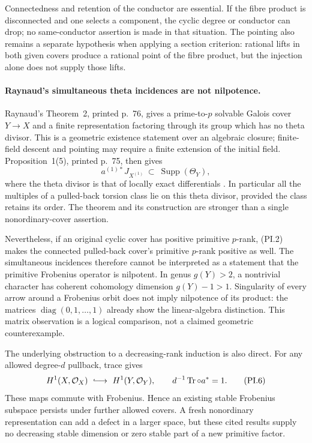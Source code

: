 \documentclass[11pt,a4paper]{article}
\begin{document}
Connectedness and retention of the conductor are essential.
If the fibre product is disconnected and one selects a
component, the cyclic degree or conductor can drop; no
same-conductor assertion is made in that situation.
The pointing also remains a separate hypothesis when applying
a section criterion: rational lifts in both given covers
produce a rational point of the fibre product, but the
injection alone does not supply those lifts.

\paragraph{Raynaud's simultaneous theta incidences are not nilpotence.}
Raynaud's Theorem~2, printed p.~76, gives a prime-to-$p$
solvable Galois cover $Y\to X$ and a finite representation
factoring through its group which has no theta divisor.
This is a geometric existence statement over an algebraic
closure; finite-field descent and pointing may require a
finite extension of the initial field.
Proposition~1(5), printed p.~75, then gives
\[
 a^{(1)*}J_{X^{(1)}}\ \subset\ \operatorname{Supp}(\Theta_Y),
 \tag{PI.5}
\]
where the theta divisor is that of locally exact differentials
\cite[Proposition~1(5), Theorem~2]{RaynaudNonordinary2000}.
In particular all the multiples of a pulled-back torsion class
lie on this theta divisor, provided the class retains its order.
The theorem and its construction are stronger than a single
nonordinary-cover assertion.

Nevertheless, if an original cyclic cover has positive
primitive $p$-rank, (PI.2) makes the connected pulled-back
cover's primitive $p$-rank positive as well. The simultaneous
incidences therefore cannot be interpreted as a statement that
the primitive Frobenius operator is nilpotent. In genus
$g(Y)>2$, a nontrivial character has coherent cohomology
dimension $g(Y)-1>1$. Singularity of every arrow around a
Frobenius orbit does not imply nilpotence of its product:
the matrices $\operatorname{diag}(0,1,\ldots,1)$ already show
the linear-algebra distinction. This matrix observation is a
logical comparison, not a claimed geometric counterexample.

The underlying obstruction to a decreasing-rank induction is
also direct. For any allowed degree-$d$ pullback, trace gives
\[
 H^1(X,\mathcal O_X)\ \lhook\joinrel\longrightarrow\
 H^1(Y,\mathcal O_Y),\qquad
                 d^{-1}\operatorname{Tr}\circ a^*=1.
 \tag{PI.6}
\]
These maps commute with Frobenius. Hence an existing stable
Frobenius subspace persists under further allowed covers.
A fresh nonordinary representation can add a defect in a
larger space, but these cited results supply no decreasing
stable dimension or zero stable part of a new primitive factor.
\end{document}
